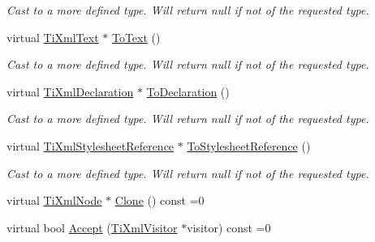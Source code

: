 \begin{DoxyCompactItemize}
\begin{DoxyCompactList}\small\item\em Cast to a more defined type. Will return null if not of the requested type. \item\end{DoxyCompactList}\item 
\hypertarget{class_ti_xml_node_a3ddfbcac78fbea041fad57e5c6d60a03}{
virtual \hyperlink{class_ti_xml_text}{TiXmlText} $\ast$ \hyperlink{class_ti_xml_node_a3ddfbcac78fbea041fad57e5c6d60a03}{ToText} ()}
\label{class_ti_xml_node_a3ddfbcac78fbea041fad57e5c6d60a03}

\begin{DoxyCompactList}\small\item\em Cast to a more defined type. Will return null if not of the requested type. \item\end{DoxyCompactList}\item 
\hypertarget{class_ti_xml_node_a4027136ca820ff4a636b607231b6a6df}{
virtual \hyperlink{class_ti_xml_declaration}{TiXmlDeclaration} $\ast$ \hyperlink{class_ti_xml_node_a4027136ca820ff4a636b607231b6a6df}{ToDeclaration} ()}
\label{class_ti_xml_node_a4027136ca820ff4a636b607231b6a6df}

\begin{DoxyCompactList}\small\item\em Cast to a more defined type. Will return null if not of the requested type. \item\end{DoxyCompactList}\item 
\hypertarget{class_ti_xml_node_aed6bfe7513972fc7c5bc762a1748b1a8}{
virtual \hyperlink{class_ti_xml_stylesheet_reference}{TiXmlStylesheetReference} $\ast$ \hyperlink{class_ti_xml_node_aed6bfe7513972fc7c5bc762a1748b1a8}{ToStylesheetReference} ()}
\label{class_ti_xml_node_aed6bfe7513972fc7c5bc762a1748b1a8}

\begin{DoxyCompactList}\small\item\em Cast to a more defined type. Will return null if not of the requested type. \item\end{DoxyCompactList}\item 
virtual \hyperlink{class_ti_xml_node}{TiXmlNode} $\ast$ \hyperlink{class_ti_xml_node_a4508cc3a2d7a98e96a54cc09c37a78a4}{Clone} () const =0
\item 
virtual bool \hyperlink{class_ti_xml_node_acc0f88b7462c6cb73809d410a4f5bb86}{Accept} (\hyperlink{class_ti_xml_visitor}{TiXmlVisitor} $\ast$visitor) const =0
\end{DoxyCompactItemize}
